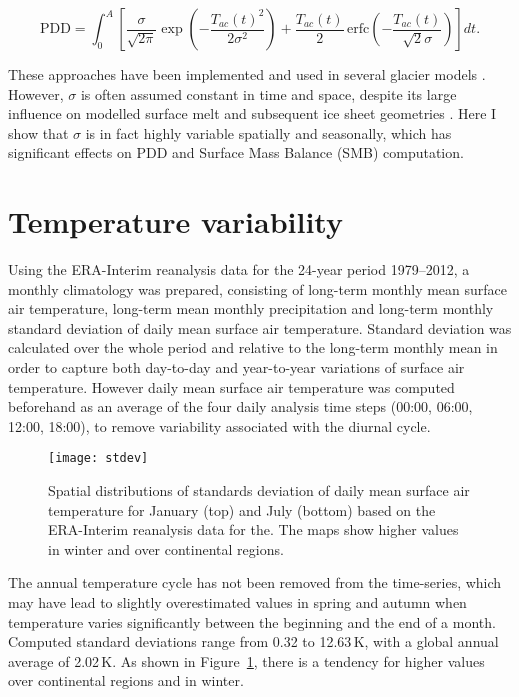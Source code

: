 \documentclass[review]{igs}
\begin{document}
\begin{equation} \label{eq:calovgreve}
  \mathrm{PDD} = \int_{0}^{A} \left[
    \frac{\sigma}{\sqrt{2\pi}}
    \exp\left({-\frac{T_{ac}(t)^2}{2\sigma^2}}\right)
    +\frac{T_{ac}(t)}{2} \,
    \mathrm{erfc} \left(-\frac{T_{ac}(t)}{\sqrt{2}\sigma}\right)
  \right]dt.
\end{equation}

These approaches have been implemented and used in several glacier models \citep[e.g.][]{letreguilly-etal-1991,greve-1997,seddik-etal-2012,charbit-etal-2013}. However, $\sigma$ is often assumed constant in time and space, despite its large influence on modelled surface melt and subsequent ice sheet geometries \citep{charbit-etal-2013}. Here I show that $\sigma$ is in fact highly variable spatially and seasonally, which has significant effects on PDD and Surface Mass Balance (SMB) computation.


\section{Temperature variability}

Using the ERA-Interim reanalysis data \citep{data:erai} for the 24-year period 1979--2012, a monthly climatology was prepared, consisting of long-term monthly mean surface air temperature, long-term mean monthly precipitation and long-term monthly standard deviation of daily mean surface air temperature. Standard deviation was calculated over the whole period and relative to the long-term monthly mean in order to capture both day-to-day and year-to-year variations of surface air temperature. However daily mean surface air temperature was computed beforehand as an average of the four daily analysis time steps (00:00, 06:00, 12:00, 18:00), to remove variability associated with the diurnal cycle.

\begin{figure}
  \centering\texttt{[image: stdev]}
  \caption{Spatial distributions of standards deviation of daily mean surface air temperature for January (top) and July (bottom) based on the ERA-Interim reanalysis \citep{data:erai} data for the. The maps show higher values in winter and over continental regions.}
  \label{fig:stdev}
\end{figure}

The annual temperature cycle has not been removed from the time-series, which may have lead to slightly overestimated values in spring and autumn when temperature varies significantly between the beginning and the end of a month. Computed standard deviations range from 0.32 to 12.63\,K, with a global annual average of 2.02\,K. As shown in Figure~\ref{fig:stdev}, there is a tendency for higher values over continental regions and in winter.
\end{document}
